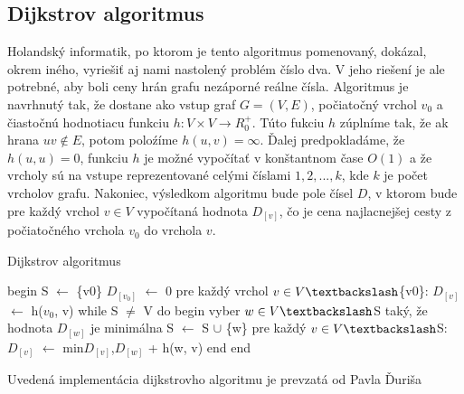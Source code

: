 \subsection{Dijkstrov algoritmus}

Holandský informatik, po ktorom je tento algoritmus pomenovaný, dokázal, okrem iného, vyriešiť aj nami nastolený problém číslo dva. V jeho riešení je ale potrebné, aby boli ceny hrán grafu nezáporné reálne čísla. Algoritmus je navrhnutý tak, že dostane ako vstup graf $G = (V, E)$, počiatočný vrchol $v_{0}$ a čiastočnú hodnotiacu funkciu $h: V \times V \rightarrow R^{+}_{0}$. Túto fukciu $h$ zúplníme tak, že ak hrana $uv \notin E$, potom poloźíme $h(u,v) = \infty$. Ďalej predpokladáme, že $h(u,u) = 0$, funkciu $h$ je možné vypočítať v konštantnom čase $O(1)$ a že vrcholy sú na vstupe reprezentované celými číslami $1, 2, ..., k$, kde $k$ je počet vrcholov grafu. Nakoniec, výsledkom algoritmu bude pole čísel $D$, v ktorom bude pre každý vrchol $v \in V$ vypočítaná hodnota $D_{[v]}$, čo je cena najlacnejšej cesty z počiatočného vrchola $v_{0}$ do vrchola $v$. \newline

\begin{algorithm} 
  \caption{Dijkstrov algoritmus}
  \label{dijkstra}
  \begin{algorithmic}[1]
   	 \State begin
		\State S $\leftarrow$ \{v0\}
		\State $D_{[v_{0}]}$ $\leftarrow$ 0
		\State pre každý vrchol $v \in V \textbackslash$\{v0\}: $D_{[v]}$ $\leftarrow$ h($v_{0}$, v)
		\State while S $\neq$ V do begin
			\State vyber $w \in V \textbackslash$S taký, že hodnota $D_{[w]}$ je minimálna
			\State S $\leftarrow$ S $\cup$ \{w\}
			\State pre každý $v \in V  \textbackslash$S:
				\State $D_{[v]}$ $\leftarrow$ min{$D_{[v]}$,$D_{[w]}$ + h(w, v)}
		\State end
	\State end
  \end{algorithmic} 
\end{algorithm}

Uvedená implementácia dijkstrovho algoritmu je prevzatá od Pavla Ďuriša \cite[kapitola 2.2.1]{duris2009}\newline